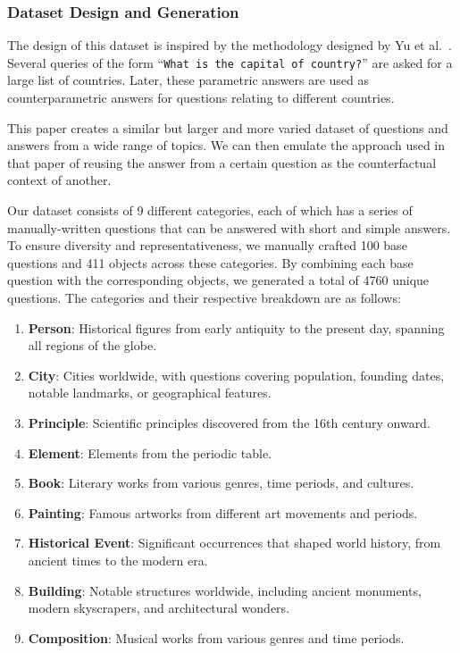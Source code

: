 \subsubsection{Dataset Design and Generation}

The design of this dataset is inspired by the methodology designed by Yu et al.~\cite{factual_recall}.
Several queries of the form ``\texttt{What is the capital of {country}?}'' are asked for a large list of countries.
Later, these parametric answers are used as counterparametric answers for questions relating to different countries.

This paper creates a similar but larger and more varied dataset of questions and answers from a wide range of topics.
We can then emulate the approach used in that paper of reusing the answer from a certain question as the counterfactual context of another.

Our dataset consists of 9 different categories, each of which has a series of manually-written questions that can be answered with short and simple answers.
To ensure diversity and representativeness, we manually crafted 100 base questions and 411 objects across these categories.
By combining each base question with the corresponding objects, we generated a total of 4760 unique questions.
The categories and their respective breakdown are as follows:

\begin{enumerate}
	\item \textbf{Person}: Historical figures from early antiquity to the present day, spanning all regions of the globe.
	\item \textbf{City}: Cities worldwide, with questions covering population, founding dates, notable landmarks, or geographical features.
	\item \textbf{Principle}: Scientific principles discovered from the 16th century onward.
	\item \textbf{Element}: Elements from the periodic table.
	\item \textbf{Book}: Literary works from various genres, time periods, and cultures.
	\item \textbf{Painting}: Famous artworks from different art movements and periods.
	\item \textbf{Historical Event}: Significant occurrences that shaped world history, from ancient times to the modern era.
	\item \textbf{Building}: Notable structures worldwide, including ancient monuments, modern skyscrapers, and architectural wonders.
	\item \textbf{Composition}: Musical works from various genres and time periods.
\end{enumerate}

